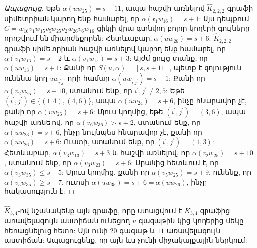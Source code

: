 \begin{proof}[Ապացույց]
Եթե $\alpha(uw_{25})=s+11$, ապա հաշվի առնելով 
$\widehat{K}_{2,2,2}$ գրաֆի սիմետրիան կարող ենք համարել, որ $\alpha(v_{1}w_{16})=s+1$:
Այս դեպքում 
$C=w_{16}v_{1}w_{15}v_{5}w_{25}v_{2}w_{26}v_{6}w_{16}$ ցիկլի վրա գտնվող բոլոր կողերի գույները որոշվում են միարժեքորեն: Հետևաբար, $\alpha(uw_{26})=s+6$: $\widehat{K}_{2,2,2}$ գրաֆի սիմետրիան հաշվի առնելով կարող ենք համարել, որ 
$\alpha(v_{1}w_{13})=s+2$ և $\alpha(v_{1}w_{14})=s+3$: Այժմ ցույց տանք, որ $\alpha(uw_{13})=s+1$: Քանի որ $S(u,\alpha)=[s,s+11]$, պետք է գոյություն ունենա կող $uw_{i^{\prime}j^{\prime}}$ որի համար
$\alpha\left(uw_{i^{\prime}j^{\prime}}\right)=s+1$: Քանի որ
$\alpha(v_{2}w_{25})=s+10$, ստանում ենք, որ $i^{\prime},j^{\prime}
\neq 2,5$: Եթե $\left(i^{\prime},j^{\prime}\right)\in
\{(1,4),(4,6)\}$, ապա $\alpha(uw_{24})=s+6$, ինչը հնարավոր չէ, քանի որ $\alpha(uw_{26})=s+6$: Մյուս կողմից, եթե 
$\left(i^{\prime},j^{\prime}\right)=(3,6)$, ապա հաշվի առնելով, որ
$\alpha(v_{6}w_{36})>s+2$, ստանում ենք, որ $\alpha(uw_{23})=s+6$, ինչը նույնպես հնարավոր չէ, քանի որ $\alpha(uw_{26})=s+6$: Ուստի, ստանում ենք, որ
$\left(i^{\prime},j^{\prime}\right)=(1,3)$: Հետևաբար,
$\alpha(v_{3}w_{13})=s+3$ և հաշվի առնելով, որ 
$\alpha(v_{2}w_{25})=s+10$, ստանում ենք, որ $\alpha(v_{3}w_{23})=s+6$: Սրանից հետևում է, որ $\alpha(v_{3}w_{35})\leq s+5$: Մյուս կողմից, քանի որ 
$\alpha(v_{5}w_{25})=s+9$, ունենք, որ $\alpha(v_{5}w_{35})\geq s+7$, ուտսի $\alpha(uw_{35})=s+6=\alpha(uw_{26})$, ինչը հակասություն է:
\end{proof}

$\widehat{K}_{3,4}^{\prime}$-ով նշանակենք այն գրաֆը, որը ստացվում է $\widehat{K}_{3,4}$ գրաֆից առավելագույն աստիճան ունեցող $u$ գագաթին կից կողերից մեկը հեռացնելուց հետո: Այն ունի $20$ գագաթ և $11$ առավելագույն աստիճան: Ապացուցենք, որ այն ևս չունի միջակայքային ներկում:

